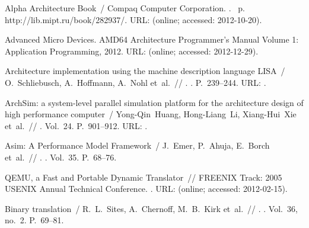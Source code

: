 \begin{thebibliography}{10}
Alpha Architecture Book~/ Compaq Computer Cor\-po\-ra\-tion. \BibDash
{}. \BibDash
{}~p. \BibDash
\newblock http://lib.mipt.ru/book/282937/. URL:
   (online; accessed: 2012-10-20).

Advanced Micro Devices. \BibDash
\newblock AMD64 Architecture Programmer’s Manual Volume 1: Application
  Programming, 2012. \BibDash
\newblock URL:
  (online; accessed: 2012-12-29).

{Architecture implementation using the machine description language {LISA}}~/
  O.~Schliebusch, A.~Hoffmann, A.~Nohl et~al.~// .
  \BibDash
{}. \BibDash
\newblock P.~239–244. \BibDash
\newblock URL:
  .

{ArchSim: a system-level parallel simulation platform for the architecture
  design of high performance computer}~/ Yong-Qin~Huang, Hong-Liang~Li,
  Xiang-Hui~Xie et~al.~//
  \href{http://dx.doi.org/10.1007/s11390-009-9281-9}{} \BibDash
{}. \BibDash
\newblock Vol.~24. \BibDash
\newblock P.~901–912. \BibDash
\newblock URL: .

{Asim: A Performance Model Framework}~/ J.~Emer, P.~Ahuja, E.~Borch et~al.~//
  \href{http://dx.doi.org/10.1109/2.982918}{}. \BibDash
{}. \BibDash
\newblock Vol.~35. \BibDash
\newblock P.~68–76.

 {{QEMU}, a Fast and Portable Dynamic Translator}~//
  {FREENIX Track: 2005 USENIX Annual Technical Conference}. \BibDash
{}. \BibDash
\newblock URL:
  (online; accessed: 2012-02-15).

{Binary translation}~/ R.~L.~Sites, A.~Chernoff, M.~B.~Kirk et~al.~//
  . \BibDash
{}. \BibDash
\newblock Vol.~36, no.~2. \BibDash
\newblock P.~69–81.


\end{thebibliography}
